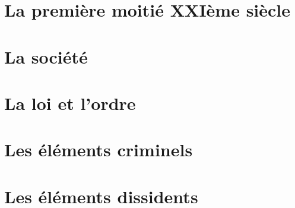 \documentclass[10pt,a4paper,twocolumn]{article}
\begin{document}
\chapter{La première moitié XXIème siècle}

\chapter{La société}
\chapter{La loi et l'ordre}
\chapter{Les éléments criminels}
\chapter{Les éléments dissidents}
\end{document}
